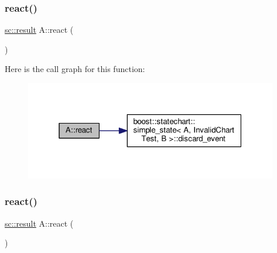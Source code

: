 \subsubsection{\texorpdfstring{react()}{react()}\hspace{0.1cm}{\footnotesize\ttfamily [6/11]}}
{\footnotesize\ttfamily \mbox{\hyperlink{namespaceboost_1_1statechart_abe807f6598b614d6d87bb951ecd92331}{sc\+::result}} A\+::react (\begin{DoxyParamCaption}\item[{const \mbox{\hyperlink{struct_ev_discard_in_b}{Ev\+Discard\+InB}} \&}]{ }\end{DoxyParamCaption})\hspace{0.3cm}{\ttfamily [inline]}}

Here is the call graph for this function\+:
\nopagebreak
\begin{figure}[H]
\begin{center}
\leavevmode
\includegraphics[width=313pt]{struct_a_a59fa7dccf0b31b8a69a6e5607be864d1_cgraph}
\end{center}
\end{figure}
\mbox{\label{struct_a_aeebabda5b0df22ae3c95fb0415135aa6}} 
\subsubsection{\texorpdfstring{react()}{react()}\hspace{0.1cm}{\footnotesize\ttfamily [7/11]}}
{\footnotesize\ttfamily \mbox{\hyperlink{namespaceboost_1_1statechart_abe807f6598b614d6d87bb951ecd92331}{sc\+::result}} A\+::react (\begin{DoxyParamCaption}\item[{const \mbox{\hyperlink{struct_ev_discard_in_d}{Ev\+Discard\+InD}} \&}]{ }\end{DoxyParamCaption})\hspace{0.3cm}{\ttfamily [inline]}}

